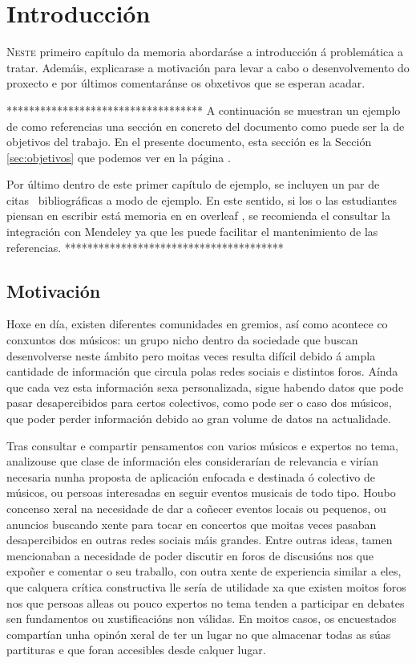 \chapter{Introducción}
\label{chap:introduccion}

\lettrine{N}{este} primeiro capítulo da memoria abordaráse a introducción á problemática a tratar. Ademáis, explicarase a motivación para levar a cabo o desenvolvemento do proxecto e por últimos comentaránse os obxetivos que se esperan acadar.

***********************************
A continuación se muestran un ejemplo de como referencias una sección 
en concreto del documento como puede ser la de objetivos del trabajo. 
En el presente documento, esta sección es la Sección \ref{sec:objetivos}
que podemos ver en la página \pageref{sec:objetivos}.

Por último dentro de este primer capítulo de ejemplo, se incluyen un 
par de citas~\cite{RAE,RAGA, van2005student} bibliográficas a modo 
de ejemplo. En este sentido, si los o las estudiantes piensan en 
escribir está memoria en en overleaf \cite{Overleaf}, se recomienda el 
consultar la integración con Mendeley \cite{Mendeley} ya que les puede 
facilitar el mantenimiento de las referencias.
***************************************

\section{Motivación}
\label{sec:motivación}

Hoxe en día, existen diferentes comunidades en gremios, así como acontece co conxuntos dos músicos: un grupo nicho dentro da sociedade que buscan desenvolverse neste ámbito pero moitas veces resulta difícil debido á ampla cantidade de información que circula polas redes sociais e distintos foros. Aínda que cada vez esta información sexa personalizada, sigue habendo datos que pode pasar desapercibidos para certos colectivos, como pode ser o caso dos músicos, que poder perder información debido ao gran volume de datos na actualidade.

Tras consultar e compartir pensamentos con varios músicos e expertos no tema, analizouse que clase de información eles considerarían de relevancia e virían necesaria nunha proposta de aplicación enfocada e destinada ó colectivo de músicos, ou persoas interesadas en seguir eventos  musicais de todo tipo. Houbo concenso xeral na necesidade de dar a coñecer eventos locais ou pequenos, ou anuncios buscando xente para tocar en concertos que moitas veces pasaban desapercibidos en outras redes sociais máis grandes. Entre outras ideas, tamen mencionaban a necesidade de poder discutir en foros de discusións nos que expoñer e comentar o seu traballo, con outra xente de experiencia similar a eles, que calquera crítica constructiva lle sería de utilidade xa que existen moitos foros nos que persoas alleas ou pouco expertos no tema tenden a participar en debates sen fundamentos ou xustificacións non válidas.
En moitos casos, os encuestados compartían unha opinón xeral de ter un lugar no que almacenar todas as súas partituras e que foran accesibles desde calquer lugar. 

